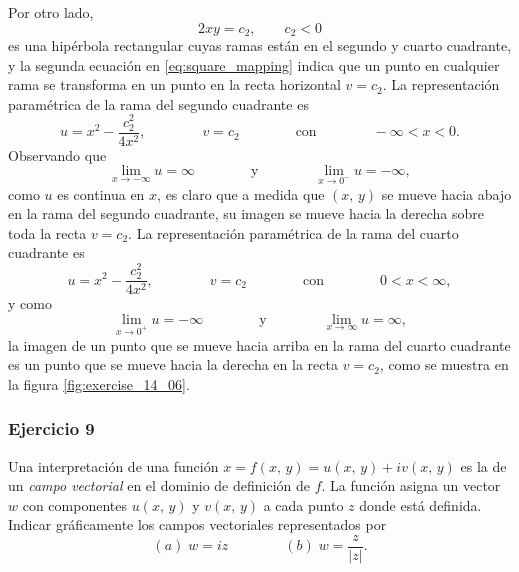 \documentclass[a4paper]{report}
\begin{document}
Por otro lado, 
\[
 2xy=c_2,\qquad c_2<0
\]
es una hipérbola rectangular cuyas ramas están en el segundo y cuarto cuadrante, y la segunda ecuación en \ref{eq:square_mapping} indica que un punto en cualquier rama se transforma en un punto en la recta horizontal \(v=c_2\). La representación paramétrica de la rama del segundo cuadrante es
\[
 u=x^2-\frac{c_2^2}{4x^2},\qquad\qquad v=c_2\qquad\qquad\textrm{con}\qquad\qquad-\infty<x<0.
\]
Observando que 
\[
 \lim_{x\to-\infty}u=\infty
 \qquad\qquad\textrm{y}\qquad\qquad
 \lim_{x\to0^-}u=-\infty,
\]
como \(u\) es continua en \(x\), es claro que a medida que \((x,\,y)\) se mueve hacia abajo en la rama del segundo cuadrante, su imagen se mueve hacia la derecha sobre toda la recta \(v=c_2\). La representación paramétrica de la rama del cuarto cuadrante es
\[
 u=x^2-\frac{c_2^2}{4x^2},\qquad\qquad v=c_2\qquad\qquad\textrm{con}\qquad\qquad0<x<\infty,
\]
y como
\[
 \lim_{x\to0^+}u=-\infty
 \qquad\qquad\textrm{y}\qquad\qquad
 \lim_{x\to\infty}u=\infty,
\]
la imagen de un punto que se mueve hacia arriba en la rama del cuarto cuadrante es un punto que se mueve hacia la derecha en la recta \(v=c_2\), como se muestra en la figura \ref{fig:exercise_14_06}.

\subsubsection{Ejercicio 9}

Una interpretación de una función \(x=f(x,\,y)=u(x,\,y)+iv(x,\,y)\) es la de un \emph{campo vectorial} en el dominio de definición de \(f\). La función asigna un vector \(w\) con componentes \(u(x,\,y)\) y \(v(x,\,y)\) a cada punto \(z\) donde está definida. Indicar gráficamente los campos vectoriales representados por
\[
 (\textit{a})\;w=iz\qquad\qquad (\textit{b})\;w=\frac{z}{|z|}.
\]
\end{document}
